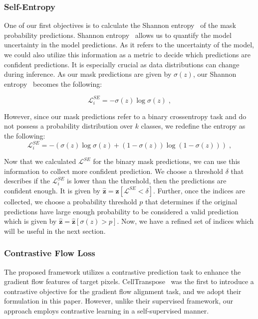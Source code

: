 \subsubsection{Self-Entropy}\label{sec:tta-se}
One of our first objectives is to calculate the Shannon entropy~\cite{shannon1948mathematical} of the mask probability predictions. Shannon entropy~\cite{shannon1948mathematical} allows us to quantify the model uncertainty in the model predictions. As it refers to the uncertainty of the model, we could also utilize this information as a metric to decide which predictions are confident predictions. It is especially crucial as data distributions can change during inference. As our mask predictions are given by $\sigma(z)$, our Shannon entropy~\cite{shannon1948mathematical} becomes the following:

\begin{equation}
    \mathcal{L}_i^{SE} = -\sigma(z) \log \sigma(z) \; ,
\end{equation}

However, since our mask predictions refer to a binary crossentropy task and do not possess a probability distribution over $k$ classes, we redefine the entropy as the following:
\begin{equation}
    \mathcal{L}_i^{SE} = -(\sigma(z) \log \sigma(z) + (1-\sigma(z)) \log (1-\sigma(z))) \; ,
\end{equation}

Now that we calculated $\mathcal{L}^{SE}$ for the binary mask predictions, we can use this information to collect more confident prediction. We choose a threshold $\delta$ that describes if the $\mathcal{L}_i^{SE}$ is lower than the threshold, then the predictions are confident enough. It is given by $\hat{\bm{z}} = \bm{z}[\mathcal{L}^{SE}<\delta]$. Further, once the indices are collected, we choose a probability threshold $p$ that determines if the original predictions have large enough probability to be considered a valid prediction which is given by $\hat{\bm{z}} = \hat{\bm{z}}[\sigma(z)>p]$. Now, we have a refined set of indices which will be useful in the next section. 

\subsubsection{Contrastive Flow Loss} \label{sec:tta-cfl}
The proposed framework utilizes a contrastive prediction task to enhance the gradient flow features of target pixels.  CellTranspose~\cite{keaton2023celltranspose} was the first to introduce a contrastive objective for the gradient flow alignment task, and we adopt their formulation in this paper. However, unlike their supervised framework, our approach employs contrastive learning in a self-supervised manner. \\

